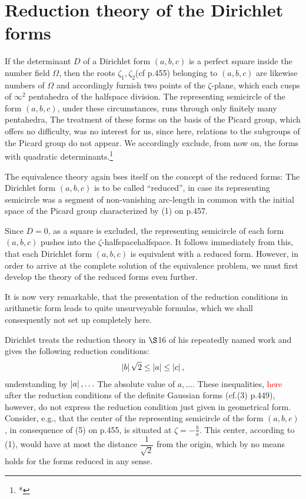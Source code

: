 \section{Reduction theory of the Dirichlet forms}

If the determinant $D$ of a Dirichlet form $(a,b,c)$ is a perfect square inside the number field $\Omega$, then the roots $\zeta_1, \zeta_2$(cf p.455) belonging to $(a,b,c)$ are likewise numbers of $\Omega$ and accordingly furnish two points of the $\zeta$-plane, which each cusps of $\infty^2$ pentahedra of the halfspace division. The representing semicircle of the form $(a,b,c)$, under these circumstances, runs through only finitely many pentahedra, The treatment of these forms on the basis of the Picard group, which offers no difficulty, was no interest for us, since here, relations to the subgroups of the Picard group do not appear. We accordingly exclude, from now on, the forms with quadratic determinants.\footnote{*}

The equivalence theory again bses itself on the concept of the reduced forms: The Dirichlet form $(a,b,c)$ is to be called “reduced”, in case its representing semicircle was a segment of non-vanishing arc-length in common with the initial space of the Picard group characterized by (1) on p.457.

Since $D=0$, as a square is excluded, the representing semicircle of each form $(a,b,c)$ pushes into the $\zeta$-halfspacehalfspace. It follows immediately from this, that each Dirichlet form $(a,b,c)$ is equivalent with a reduced form. However, in order to arrive at the complete solution of the equivalence problem, we must first develop the theory of the reduced forms even further.

It is now very remarkable, that the presentation of the reduction conditions in arithmetic form leads to quite unsurveyable formulas, which we shall consequently not set up completely here.

Dirichlet treats the reduction theory in $\S$16 of his repeatedly named work and gives the following reduction conditions:
\begin{align}
	\left|b\right|\sqrt{2}\leq \left|a\right|\leq\left|c\right|,
\end{align}
understanding by $\left|a\right|,\ldots$ The absolute value of $a, \ldots$. These inequalities, \textcolor{red}{here} after the reduction conditions of the definite Gaussian forms (cf.(3) p.449), however, do not express the reduction condition just given in geometrical form. Consider, e.g., that the center of the representing semicircle of the form $(a,b,c)$, in consequence of (5) on p.455, is situated at $\zeta=-\frac{b}{a}$. This center, according to (1), would have at most the distance $\dfrac{1}{\sqrt{2}}$ from the origin, which by no means holds for the forms reduced in any sense.

